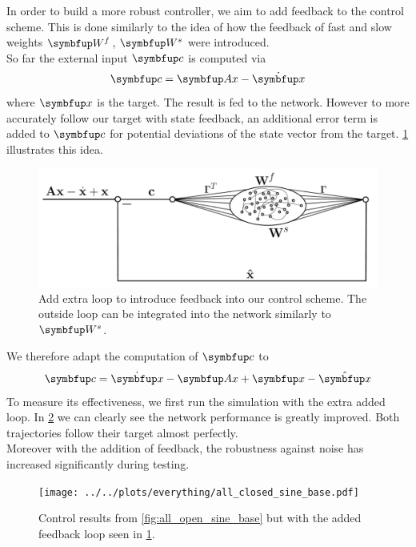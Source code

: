 In order to build a more robust controller, we aim to add feedback to the control scheme. This is done similarly to the idea of how the feedback of fast and slow weights $\bmu{W}^f$, $\bmu{W}^s$ were introduced.\\
So far the external input $\bmu{c}$ is computed via
\begin{equation}
	\bmu{c} = \bmu{Ax} -\dot{\bmu{x}}
\end{equation}
where $\bmu{x}$ is the target. The result is fed to the network. However to more accurately follow our target with state feedback, an additional error term is added to $\bmu{c}$ for potential deviations of the state vector from the target. \cref{fig:schematic_feedback_control} illustrates this idea.
\begin{figure}
	\centering
	\includegraphics[width=\textwidth]{svg-inkscape/schematic_closed_loop_controller.pdf}
	\caption{Add extra loop to introduce feedback into our control scheme. The outside loop can be integrated into the network similarly to $\bmu{W}^s$.}
	\label{fig:schematic_feedback_control}
\end{figure}
We therefore adapt the computation of $\bmu{c}$ to
\begin{equation}
	\bmu{c} = \dot{\bmu{x}} - \bmu{Ax} + \bmu{x} - \hat{\bmu{x}}
\end{equation}
To measure its effectiveness, we first run the simulation with the extra added loop. In \cref{fig:all_closed_feedback_extra_loop} we can clearly see the network performance is greatly improved. Both trajectories follow their target almost perfectly.\\
Moreover with the addition of feedback, the robustness against noise has increased significantly during testing.\\
\begin{figure}
	\centering
	\texttt{[image: ../../plots/everything/all\_closed\_sine\_base.pdf]}
	\caption{Control results from \cref{fig:all_open_sine_base} but with the added feedback loop seen in \cref{fig:schematic_feedback_control}.}
	\label{fig:all_closed_feedback_extra_loop}
\end{figure}
